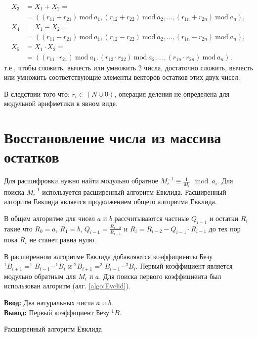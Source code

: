 \documentclass[10pt]{article}
\begin{document}
\begin{align} 
	X_3 &= X_1 + X_2 = \nonumber \\ 
	& = ((r_{11} + r_{21})\ \mathrm{mod}\ a_1, (r_{12} + r_{22})\ \mathrm{mod}\ a_2, ..., (r_{1n} + r_{2n})\ \mathrm{mod}\ a_n), \\
	X_4 &= X_1 - X_2 = \nonumber \\ 
	& =((r_{11} - r_{21})\ \mathrm{mod}\ a_1, (r_{12} - r_{22})\ \mathrm{mod}\ a_2, ..., (r_{1n} - r_{2n})\ \mathrm{mod}\ a_n), \\
	X_5 &= X_1 \cdot X_2 = \nonumber \\ 
	& = ((r_{11} \cdot r_{21})\ \mathrm{mod}\ a_1, (r_{12} \cdot r_{22})\ \mathrm{mod}\ a_2, ..., (r_{1n} \cdot r_{2n})\ \mathrm{mod}\ a_n), 
\end{align}
т.е., чтобы сложить, вычесть или умножить 2 числа, достаточно сложить, вычесть или умножить соответствующие элементы векторов остатков этих двух чисел.

В следствии того что: $r_i \in (N \cup 0) $, операция деления не определена для модульной арифметики в явном виде.

\section{Восстановление числа из массива остатков}

Для расшифровки нужно найти модульно обратное $M_i^{-1}\equiv\frac{1}{M_i}\mod a_i$. Для поиска $M_i^{-1}$ используется расширенный алгоритм Евклида.
Расширенный алгоритм Евклида \cite{Okulov2011} является продолжением общего алгоритма Евклида. 

В общем алгоритме для чисел $a$ и $b$ рассчитываются частные $Q_{i-1}$ и остатки $R_i$ такие что $R_0 = a$, $R_1 = b$, $Q_{i-1} = \frac{R_{i-2}}{R_{i-1}}$ и $R_i = R_{i-2} - Q_{i-1} \cdot R_{i-1}$ до тех пор пока $R_i$ не станет равна нулю.

В расширенном алгоритме Евклида добавляются коэффициенты Безу $^1B_{i+1} = ^1B_{i-1} - ^1B_{i}$ и $^2B_{i+1} = ^2B_{i-1} - ^2B_{i}$. Первый коэффициент является модульно обратным для $M_i$ и $a$. Для поиска первого коэффициента был использован алгоритм (алг. \ref{algo:Evclid}).


\begin{algorithm}[H]
	\textbf{Ввод:} Два натуральных числа $a$ и $b$.\\
	\textbf{Вывод:} Первый коэффициент Безу $^1B$.
	\begin{algorithmic}
		\ENDWHILE {}
	\end{algorithmic}
	\caption{Расширенный алгоритм Евклида}
	\label{algo:Evclid}
\end{algorithm}
\end{document}
